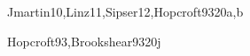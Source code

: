 \begin{syllabus}
\begin{unit}{\ALAdvancedComputationalComplexity}{}{Jmartin10,Linz11,Sipser12,Hopcroft93}{20}{a,b}
\begin{topics}%
	\item \ALAdvancedComputationalComplexityTopicReview
	\item \ALAdvancedComputationalComplexityTopicPolynomial
	\item \ALAdvancedComputationalComplexityTopicNp
	\item \ALAdvancedComputationalComplexityTopicClassic
	\item \ALAdvancedComputationalComplexityTopicReduction
\end{topics}
\begin{learningoutcomes}
	\item \ALAdvancedComputationalComplexityLODefineThe [\Assessment]
	\item \ALAdvancedComputationalComplexityLODefineTheClass [\Assessment]
	\item \ALAdvancedComputationalComplexityLOExplainTheNpAppears [\Assessment]
	\item \ALAdvancedComputationalComplexityLOProvide [\Assessment]
	\item \ALAdvancedComputationalComplexityLOProve [\Assessment]
\end{learningoutcomes}
\end{unit}

\begin{unit}{\ALAdvancedAutomataTheoryandComputability}{}{Hopcroft93,Brookshear93}{20}{j}
\begin{topics}%
	\item \ALAdvancedAutomataTheoryandComputabilityTopicSets
	\item \ALAdvancedAutomataTheoryandComputabilityTopicContext
\end{topics}
\begin{learningoutcomes}
	\item \ALAdvancedAutomataTheoryandComputabilityLODetermineA [\Assessment]
	\item \ALAdvancedAutomataTheoryandComputabilityLOConvert [\Assessment]
\end{learningoutcomes}
\end{unit}

\begin{coursebibliography}
\end{coursebibliography}

\end{syllabus}
